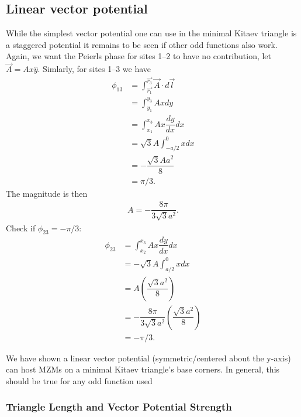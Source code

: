 \subsection{Linear vector potential}

While the simplest vector potential one can use in the minimal Kitaev triangle is a staggered potential it remains to be seen if other odd functions also work.
Again, we want the Peierls phase for sites 1--2 to have no contribution, let $\vec{A} = Ax\hat{y}$.
Simlarly, for sites 1--3 we have
\begin{align}
  \phi_{13} &= \int_{\vec{r_1}}^{\vec{r_3}} \vec{A} \cdot d\vec{l} \nonumber \\
  &= \int_{y_1}^{y_3} Ax dy \nonumber \\
  &= \int_{x_1}^{x_3} Ax \dfrac{dy}{dx} dx \nonumber \\
  &= \sqrt{3} A \int_{-a/2}^{0} x dx \nonumber \\
  &= -\dfrac{\sqrt{3} A a^2}{8}  \nonumber \\
  &= \pi/3. \nonumber
\end{align}
The magnitude is then
\begin{align}
  A = -\dfrac{8 \pi}{3 \sqrt{3} a^2}.
\end{align}
Check if $\phi_{23} = -\pi/3$:
\begin{align}
  \phi_{23} &= \int_{x_2}^{x_3} Ax \dfrac{dy}{dx} dx \nonumber \\
  &= -\sqrt{3} A \int^{0}_{a/2} x dx \nonumber \\
  &= A \left(\dfrac{\sqrt{3} a^2}{8}\right)  \nonumber \\
  &= -\dfrac{8 \pi}{3 \sqrt{3} a^2} \left(\dfrac{\sqrt{3} a^2}{8}\right)  \nonumber \\
  &= -\pi/3 \nonumber.
\end{align}

We have shown a linear vector potential (symmetric/centered about the y-axis) can host MZMs on a minimal Kitaev triangle's base corners.
In general, this should be true for any odd function used
\subsubsection{Triangle Length and Vector Potential Strength}

